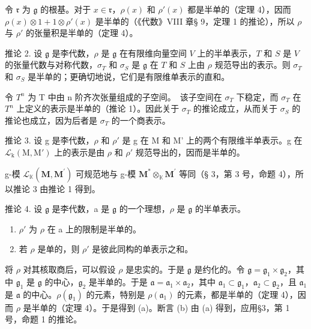 令 \(\mathfrak{r}\) 为 \(\mathfrak{g}\) 的根基。对于 \(x \in \mathfrak{r}\)，\(\rho(x)\) 和 \(\rho'(x)\) 都是半单的（定理 4），因而 \(\rho(x) \otimes 1 + 1 \otimes \rho'(x)\) 是半单的（《代数》VIII 章§ 9，定理 1 的推论），所以 \(\rho\) 与 \(\rho'\) 的张量积是半单的（定理 4）。

推论 2. 设 \(\mathfrak{g}\) 是李代数，\(\rho\) 是 \(\mathfrak{g}\) 在有限维向量空间 \(V\) 上的半单表示，\(T\) 和 \(S\) 是 \(V\) 的张量代数与对称代数，\(\sigma_{T}\) 和 \(\sigma_{S}\) 是 \(\mathfrak{g}\) 在 \(T\) 和 \(S\) 上由 \(\rho\) 规范导出的表示。则 \(\sigma_{T}\) 和 \(\sigma_{S}\) 是半单的；更确切地说，它们是有限维单表示的直和。

令 \(T^{n}\) 为 T 中由 n 阶齐次张量组成的子空间。~该子空间在 \(\sigma_{T}\) 下稳定，而 \(\sigma_{T}\) 在 \(T^{n}\) 上定义的表示是半单的（推论 1）。因此关于 \(\sigma_{T}\) 的推论成立，从而关于 \(\sigma_{S}\) 的推论也成立，因为后者是 \(\sigma_{T}\) 的一个商表示。

推论 3. 设 g 是李代数，\(\rho\) 和 \(\rho'\) 是 g 在 M 和 M' 上的两个有限维半单表示。g 在 \(\mathcal{L}_{\mathrm{k}}(\mathrm{M},\mathrm{M}')\) 上的表示是由 \(\rho\) 和 \(\rho'\) 规范导出的，因而是半单的。

g-模 \(\mathcal{L}_{\mathbb{K}}(\mathbf{M},\mathbf{M}^{\prime})\) 可规范地与 g-模 \(\mathbf{M}^{*}\otimes_{\mathbb{K}}\mathbf{M}^{\prime}\) 等同（§ 3，第 3 号，命题 4），所以推论 3 由推论 1 得到。

推论 4. 设 \(\mathfrak{g}\) 是李代数，a 是 \(\mathfrak{g}\) 的一个理想，\(\rho\) 是 \(\mathfrak{g}\) 的半单表示。

\begin{enumerate}
\def\labelenumi{(\alph{enumi})}
\item
  \(\rho'\) 为 \(\rho\) 在 a 上的限制是半单的。
\item
  若 \(\rho\) 是单的，则 \(\rho'\) 是彼此同构的单表示之和。
\end{enumerate}

将 \(\rho\) 对其核取商后，可以假设 \(\rho\) 是忠实的。于是 \(\mathfrak{g}\) 是约化的。令 \(\mathfrak{g} = \mathfrak{g}_1 \times \mathfrak{g}_2\)，其中 \(\mathfrak{g}_1\) 是 \(\mathfrak{g}\) 的中心，\(\mathfrak{g}_2\) 是半单的。于是 \(\mathfrak{a} = \mathfrak{a}_1 \times \mathfrak{a}_2\)，其中 \(\mathfrak{a}_1 \subset \mathfrak{g}_1\)，\(\mathfrak{a}_2 \subset \mathfrak{g}_2\)，且 \(\mathfrak{a}_1\) 是 \(\mathfrak{a}\) 的中心。\(\rho(\mathfrak{g}_1)\) 的元素，特别是 \(\rho(\mathfrak{a}_1)\) 的元素，都是半单的（定理 4），因而 \(\rho\) 是半单的（定理 4）。于是得到 (a)。断言 (b) 由 (a) 得到，应用§3，第 1 号，命题 1 的推论。


